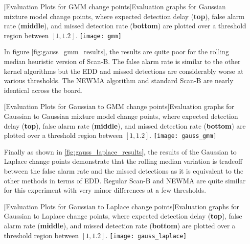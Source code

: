 \begin{minipage}{\textwidth}
\begin{center} 
[Evaluation Plots for GMM change points]{Evaluation graphs for Gaussian mixture model change points, where expected detection delay (\textbf{top}), false alarm rate (\textbf{middle}), and missed detection rate (\textbf{bottom}) are plotted over a threshold region between $[1,1.2]$. } 
\texttt{[image: gmm]} 
\label{fig:gmm_results} 
\end{center}
\end{minipage}

In figure \ref{fig:gauss_gmm_results}, the results are quite poor for the rolling median heuristic version of Scan-B. The false alarm rate is similar to the other kernel algorithms but the EDD and missed detections are considerably worse at various thresholds. The NEWMA algorithm and standard Scan-B are nearly identical across the board.

\begin{minipage}{\textwidth}
\begin{center} 
[Evaluation Plots for Gaussian to GMM change points]{Evaluation graphs for Gaussian to Gaussian mixture model change points, where expected detection delay (\textbf{top}), false alarm rate (\textbf{middle}), and missed detection rate (\textbf{bottom}) are plotted over a threshold region between $[1,1.2]$. } 
\texttt{[image: gauss\_gmm]} 
\label{fig:gauss_gmm_results} 
\end{center}
\end{minipage}

Finally as shown in \ref{fig:gauss_laplace_results}, the results of the Gaussian to Laplace change points demonstrate that the rolling median variation is tradeoff between the false alarm rate and the missed detections as it is equivalent to the other methods in terms of EDD. Regular Scan-B and NEWMA are quite similar for this experiment with very minor differences at a few thresholds.

\begin{minipage}{\textwidth}
\begin{center} 
[Evaluation Plots for Gaussian to Laplace change points]{Evaluation graphs for Gaussian to Laplace change points, where expected detection delay (\textbf{top}), false alarm rate (\textbf{middle}), and missed detection rate (\textbf{bottom}) are plotted over a threshold region between $[1,1.2]$. } 
\texttt{[image: gauss\_laplace]} 
\label{fig:gauss_laplace_results} 
\end{center}
\end{minipage}


